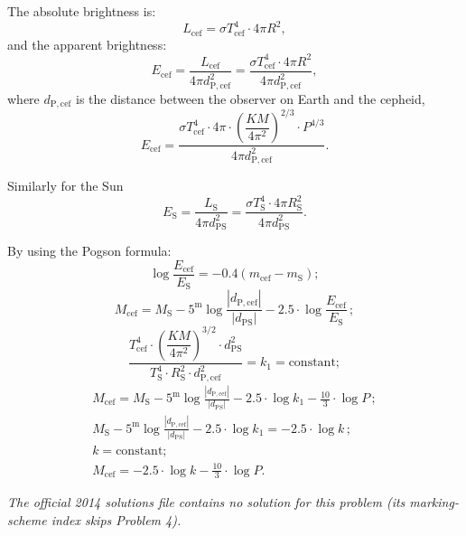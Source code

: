 The absolute brightness is:
\[ L_{\mathrm{cef}} = \sigma T_{\mathrm{cef}}^4 \cdot 4\pi R^2, \]
and the apparent brightness:
\[ E_{\mathrm{cef}} = \frac{L_{\mathrm{cef}}}{4\pi d_{\mathrm{P,cef}}^2}
   = \frac{\sigma T_{\mathrm{cef}}^4 \cdot 4\pi R^2}
          {4\pi d_{\mathrm{P,cef}}^2}, \]
where $d_{\mathrm{P,cef}}$ is the distance between the observer on Earth and
the cepheid,
\[ E_{\mathrm{cef}} = \frac{\sigma T_{\mathrm{cef}}^4\cdot 4\pi\cdot
   \left(\dfrac{KM}{4\pi^2}\right)^{2/3}\cdot P^{4/3}}
   {4\pi d_{\mathrm{P,cef}}^2}. \]

Similarly for the Sun
\[ E_{\mathrm{S}} = \frac{L_{\mathrm{S}}}{4\pi d_{\mathrm{PS}}^2}
   = \frac{\sigma T_{\mathrm{S}}^4 \cdot 4\pi R_{\mathrm{S}}^2}
          {4\pi d_{\mathrm{PS}}^2}. \]

By using the Pogson formula:
\[ \log\frac{E_{\mathrm{cef}}}{E_{\mathrm{S}}}
   = -0.4\left(m_{\mathrm{cef}} - m_{\mathrm{S}}\right); \]
\[ M_{\mathrm{cef}} = M_{\mathrm{S}}
   - 5^{\mathrm{m}}\log\frac{\left|d_{\mathrm{P,cef}}\right|}
                            {\left|d_{\mathrm{PS}}\right|}
   - 2.5\cdot\log\frac{E_{\mathrm{cef}}}{E_{\mathrm{S}}}\,; \]
\[ \frac{T_{\mathrm{cef}}^4\cdot\left(\dfrac{KM}{4\pi^2}\right)^{3/2}
   \cdot d_{\mathrm{PS}}^2}
   {T_{\mathrm{S}}^4\cdot R_{\mathrm{S}}^2\cdot d_{\mathrm{P,cef}}^2}
   = k_1 = \text{constant}; \]
\begin{gather*}
M_{\mathrm{cef}} = M_{\mathrm{S}}
  - 5^{\mathrm{m}}\log\frac{\left|d_{\mathrm{P,cef}}\right|}
                           {\left|d_{\mathrm{PS}}\right|}
  - 2.5\cdot\log k_1 - \frac{10}{3}\cdot\log P\,; \\
M_{\mathrm{S}}
  - 5^{\mathrm{m}}\log\frac{\left|d_{\mathrm{P,cef}}\right|}
                           {\left|d_{\mathrm{PS}}\right|}
  - 2.5\cdot\log k_1 = -2.5\cdot\log k\,; \\
k = \text{constant}; \\
M_{\mathrm{cef}} = -2.5\cdot\log k - \frac{10}{3}\cdot\log P.
\end{gather*}

\textit{The official 2014 solutions file contains no solution for this problem (its marking-scheme index skips Problem 4).}

